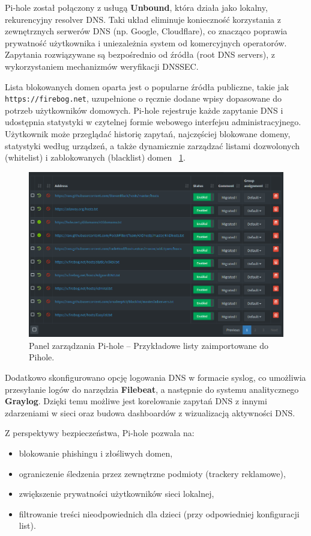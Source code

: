 \documentclass[
    left=2.5cm,         %
    right=2.5cm,        %
    top=2.5cm,          %
    bottom=3cm,         %
    bindingoffset=6mm,  %
    nohyphenation=true %
]{eiti/eiti-thesis} %
\begin{document}
Pi-hole został połączony z usługą \textbf{Unbound}, która działa jako lokalny, rekurencyjny resolver DNS. Taki układ eliminuje konieczność korzystania z zewnętrznych serwerów DNS\cite{dns-wikipedia} (np. Google, Cloudflare), co znacząco poprawia prywatność użytkownika i uniezależnia system od komercyjnych operatorów. Zapytania rozwiązywane są bezpośrednio od źródła (root DNS servers), z wykorzystaniem mechanizmów weryfikacji DNSSEC.

Lista blokowanych domen oparta jest o popularne źródła publiczne, takie jak \texttt{https://firebog.net}, uzupełnione o ręcznie dodane wpisy dopasowane do potrzeb użytkowników domowych. Pi-hole rejestruje każde zapytanie DNS i udostępnia statystyki w czytelnej formie webowego interfejsu administracyjnego. Użytkownik może przeglądać historię zapytań, najczęściej blokowane domeny, statystyki według urządzeń, a także dynamicznie zarządzać listami dozwolonych (whitelist) i zablokowanych (blacklist) domen ~\ref{fig:pihole-listy}.
\begin{figure}[H]
    \centering
    \includegraphics[width=\textwidth]{img/pihole_listy.png}
    \caption{Panel zarządzania Pi-hole – Przykładowe listy zaimportowane do Pihole.}
    \label{fig:pihole-listy}
\end{figure}

Dodatkowo skonfigurowano opcję logowania DNS w formacie syslog, co umożliwia przesyłanie logów do narzędzia \textbf{Filebeat}, a następnie do systemu analitycznego \textbf{Graylog}. Dzięki temu możliwe jest korelowanie zapytań DNS z innymi zdarzeniami w sieci oraz budowa dashboardów z wizualizacją aktywności DNS.

Z perspektywy bezpieczeństwa, Pi-hole pozwala na:
\begin{itemize}
    \item blokowanie phishingu i złośliwych domen,
    \item ograniczenie śledzenia przez zewnętrzne podmioty (trackery reklamowe),
    \item zwiększenie prywatności użytkowników sieci lokalnej,
    \item filtrowanie treści nieodpowiednich dla dzieci (przy odpowiedniej konfiguracji list).
\end{itemize}
\end{document}
